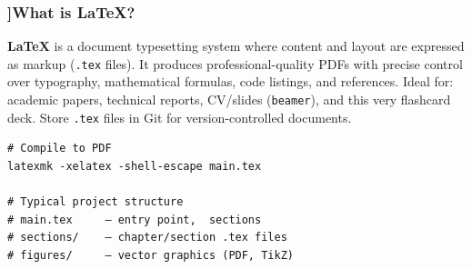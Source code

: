 \begin{frame}[fragile]
  \frametitle{\AnswerTitle[\CategoryBadge[ToolingColor!20]{Tooling \& Agile}]{What is LaTeX?}}

  {\footnotesize
  \textbf{LaTeX} is a document typesetting system where content and layout are expressed as markup (\texttt{.tex} files). It produces professional-quality PDFs with precise control over typography, mathematical formulas, code listings, and references. Ideal for: academic papers, technical reports, CV/slides (\texttt{beamer}), and this very flashcard deck. Store \texttt{.tex} files in Git for version-controlled documents.
  }

  \begin{verbatim}
# Compile to PDF
latexmk -xelatex -shell-escape main.tex

# Typical project structure
# main.tex     – entry point,  sections
# sections/    – chapter/section .tex files
# figures/     – vector graphics (PDF, TikZ)
  \end{verbatim}
\end{frame}
